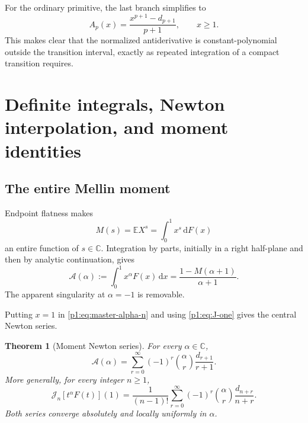 \documentclass[11pt,oneside]{article}
\newtheorem{theorem}{Theorem}[section]
\theoremstyle{definition}
\theoremstyle{remark}
\newcommand{\E}{\mathbb E}
\newcommand{\C}{\mathbb C}
\newcommand{\dd}{\,\mathrm d}
\newcommand{\Jn}{\mathcal J}
\newcommand{\1}{\mathbf 1}
\begin{document}
For the ordinary primitive, the last branch simplifies to
\begin{equation}
 A_p(x)=\frac{x^{p+1}-d_{p+1}}{p+1},\qquad x\geq1.              \label{p1:eq:Ap-right}
\end{equation}
This makes clear that the normalized antiderivative is constant-polynomial
outside the transition interval, exactly as repeated integration of a compact
transition requires.

\section{Definite integrals, Newton interpolation, and moment identities}

\subsection{The entire Mellin moment}
Endpoint flatness makes
\begin{equation}
 M(s)=\E X^s=\int_0^1x^s\dd F(x)                               \label{p1:eq:M-def}
\end{equation}
an entire function of \(s\in\C\).  Integration by parts, initially in a
right half-plane and then by analytic continuation, gives
\begin{equation}
 \boxed{\quad
 \mathcal A(\alpha):=\int_0^1x^\alpha F(x)\dd x
 =\frac{1-M(\alpha+1)}{\alpha+1}.
 \quad}                                                        \label{p1:eq:A-M}
\end{equation}
The apparent singularity at \(\alpha=-1\) is removable.

Putting \(x=1\) in \eqref{p1:eq:master-alpha-n} and using
\eqref{p1:eq:J-one} gives the central Newton series.

\begin{theorem}[Moment Newton series]\label{p1:thm:moment-newton}
For every \(\alpha\in\C\),
\begin{equation}
 \boxed{\quad
 \mathcal A(\alpha)
 =\sum_{r=0}^{\infty}(-1)^r\binom{\alpha}{r}
 \frac{d_{r+1}}{r+1}.
 \quad}                                                        \label{p1:eq:moment-newton}
\end{equation}
More generally, for every integer \(n\geq1\),
\begin{equation}
 \boxed{\quad
 \Jn_n[t^\alpha F(t)](1)
 =\frac1{(n-1)!}\sum_{r=0}^{\infty}(-1)^r\binom{\alpha}{r}
 \frac{d_{n+r}}{n+r}.
 \quad}                                                        \label{p1:eq:moment-newton-n}
\end{equation}
Both series converge absolutely and locally uniformly in \(\alpha\).
\end{theorem}
\end{document}
